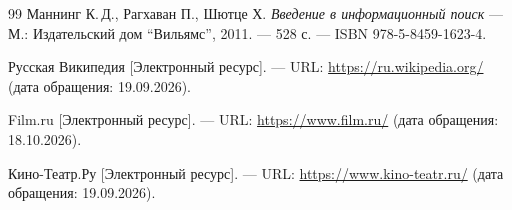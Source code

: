 \begin{thebibliography}{99}
Маннинг К.\,Д., Рагхаван П., Шютце Х.
{\itshape Введение в информационный поиск} --- М.: Издательский дом \enquote{Вильямс},
2011. --- 528 с. --- ISBN 978-5-8459-1623-4.

Русская Википедия [Электронный ресурс]. --- URL:
\href{https://ru.wikipedia.org/}{https://ru.wikipedia.org/} (дата обращения: 19.09.2026).

Film.ru [Электронный ресурс]. --- URL:
\href{https://www.film.ru/}{https://www.film.ru/} (дата обращения: 18.10.2026).

Кино-Театр.Ру [Электронный ресурс]. --- URL:
\href{https://www.kino-teatr.ru/}{https://www.kino-teatr.ru/} (дата обращения: 19.09.2026).
\end{thebibliography}
